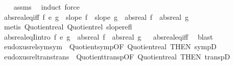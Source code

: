 \begin{isabellebody}
\ \ %
\endisadelimproof
%
\isatagproof
{}\isamarkupfalse%
\ assms\ \isamarkupfalse%
\ induct\ force%
\endisatagproof
{\isafoldproof}%
%
\isadelimproof
\isanewline
%
\endisadelimproof
\isanewline
{}\isamarkupfalse%
\ abs{\isacharunderscore}{\kern0pt}real{\isacharunderscore}{\kern0pt}eq{\isacharunderscore}{\kern0pt}iff{\isacharcolon}{\kern0pt}\ {\isachardoublequoteopen}f\ {\isasymsim}\isactrlsub e\ g\ {\isasymlongleftrightarrow}\ slope\ f\ {\isasymand}\ slope\ g\ {\isasymand}\ abs{\isacharunderscore}{\kern0pt}real\ f\ {\isacharequal}{\kern0pt}\ abs{\isacharunderscore}{\kern0pt}real\ g{\isachardoublequoteclose}\ \isanewline
%
\isadelimproof
\ \ %
\endisadelimproof
%
\isatagproof
{}\isamarkupfalse%
\ {\isacharparenleft}{\kern0pt}metis\ Quotient{\isacharunderscore}{\kern0pt}real\ Quotient{\isacharunderscore}{\kern0pt}rel\ slope{\isacharunderscore}{\kern0pt}refl{\isacharparenright}{\kern0pt}%
\endisatagproof
{\isafoldproof}%
%
\isadelimproof
\isanewline
%
\endisadelimproof
\isanewline
{}\isamarkupfalse%
\ abs{\isacharunderscore}{\kern0pt}real{\isacharunderscore}{\kern0pt}eqI{\isacharbrackleft}{\kern0pt}intro{\isacharbrackright}{\kern0pt}{\isacharcolon}{\kern0pt}\ {\isachardoublequoteopen}f\ {\isasymsim}\isactrlsub e\ g\ {\isasymLongrightarrow}\ abs{\isacharunderscore}{\kern0pt}real\ f\ {\isacharequal}{\kern0pt}\ abs{\isacharunderscore}{\kern0pt}real\ g{\isachardoublequoteclose}%
\isadelimproof
\ %
\endisadelimproof
%
\isatagproof
{}\isamarkupfalse%
\ abs{\isacharunderscore}{\kern0pt}real{\isacharunderscore}{\kern0pt}eq{\isacharunderscore}{\kern0pt}iff\ \isamarkupfalse%
\ blast%
\endisatagproof
{\isafoldproof}%
%
\isadelimproof
%
\endisadelimproof
\isanewline
\isanewline
{}\isamarkupfalse%
\ eudoxus{\isacharunderscore}{\kern0pt}rel{\isacharunderscore}{\kern0pt}sym{\isacharbrackleft}{\kern0pt}sym{\isacharbrackright}{\kern0pt}\ {\isacharequal}{\kern0pt}\ Quotient{\isacharunderscore}{\kern0pt}symp{\isacharbrackleft}{\kern0pt}OF\ Quotient{\isacharunderscore}{\kern0pt}real{\isacharcomma}{\kern0pt}\ THEN\ sympD{\isacharbrackright}{\kern0pt}\isanewline
{}\isamarkupfalse%
\ eudoxus{\isacharunderscore}{\kern0pt}rel{\isacharunderscore}{\kern0pt}trans{\isacharbrackleft}{\kern0pt}trans{\isacharbrackright}{\kern0pt}\ {\isacharequal}{\kern0pt}\ Quotient{\isacharunderscore}{\kern0pt}transp{\isacharbrackleft}{\kern0pt}OF\ Quotient{\isacharunderscore}{\kern0pt}real{\isacharcomma}{\kern0pt}\ THEN\ transpD{\isacharbrackright}{\kern0pt}\isanewline

\end{isabellebody}
